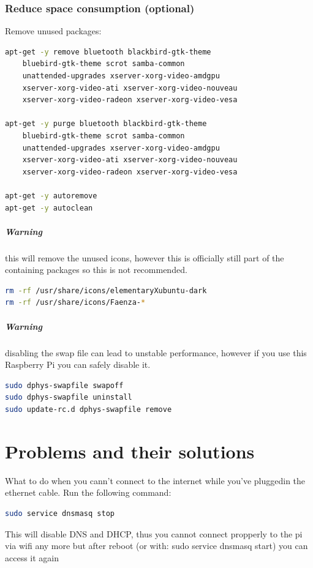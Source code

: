 \documentclass[11pt]{report}
\begin{document}
		\subsection{Reduce space consumption (optional)}
			Remove unused packages:
			\begin{lstlisting}[language=sh]
apt-get -y remove bluetooth blackbird-gtk-theme 
	bluebird-gtk-theme scrot samba-common 
	unattended-upgrades xserver-xorg-video-amdgpu 
	xserver-xorg-video-ati xserver-xorg-video-nouveau 
	xserver-xorg-video-radeon xserver-xorg-video-vesa 

apt-get -y purge bluetooth blackbird-gtk-theme 
	bluebird-gtk-theme scrot samba-common 
	unattended-upgrades xserver-xorg-video-amdgpu 
	xserver-xorg-video-ati xserver-xorg-video-nouveau 
	xserver-xorg-video-radeon xserver-xorg-video-vesa 

apt-get -y autoremove
apt-get -y autoclean
			\end{lstlisting}
			\paragraph{Warning} this will remove the unused icons, however this is officially still part of the containing packages so this is not recommended.
			\begin{lstlisting}[language=sh]
rm -rf /usr/share/icons/elementaryXubuntu-dark
rm -rf /usr/share/icons/Faenza-*
			\end{lstlisting}
			\paragraph{Warning} disabling the swap file can lead to unstable performance, however if you use this Raspberry Pi you can safely disable it.
			\begin{lstlisting}[language=sh]
sudo dphys-swapfile swapoff
sudo dphys-swapfile uninstall
sudo update-rc.d dphys-swapfile remove
			\end{lstlisting}

\chapter{Problems and their solutions}
	What to do when you cann't connect to the internet while you've pluggedin the ethernet cable. Run the following command:
	\begin{lstlisting}[language=sh]
sudo service dnsmasq stop
	\end{lstlisting} 
	This will disable DNS and DHCP, thus you cannot connect propperly to the pi via wifi any more but after reboot (or with: sudo service dnsmasq start) you can access it again
\end{document}
